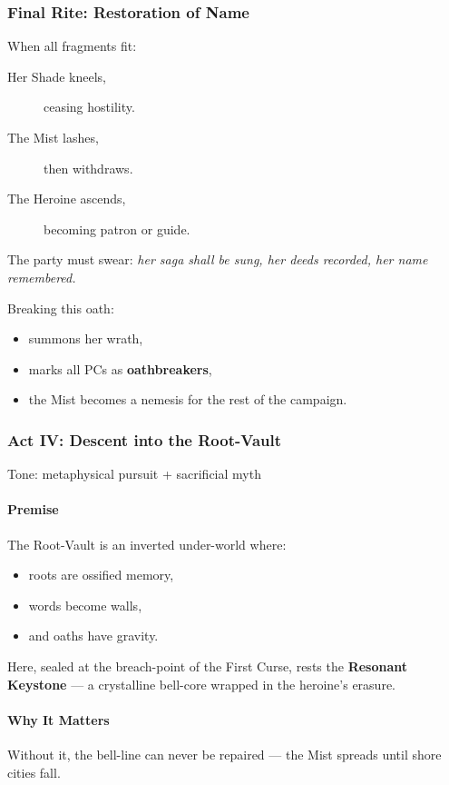 \documentclass[11pt]{article}
\begin{document}
\subsubsection*{Final Rite: Restoration of Name}
When all fragments fit:
\begin{description}
    \item[Her Shade kneels,] ceasing hostility.
    \item[The Mist lashes,] then withdraws.
    \item[The Heroine ascends,] becoming patron or guide.
\end{description}

The party must swear:
\textit{her saga shall be sung,  
her deeds recorded,  
her name remembered.}

Breaking this oath:
\begin{itemize}
    \item summons her wrath,
    \item marks all PCs as \textbf{oathbreakers},
    \item the Mist becomes a nemesis for the rest of the campaign.
\end{itemize}

\subsubsection*{Act IV: Descent into the Root-Vault}

Tone: metaphysical pursuit + sacrificial myth

\paragraph{Premise}
The Root-Vault is an inverted under-world where:
\begin{itemize}
  \item roots are ossified memory,
  \item words become walls,
  \item and oaths have gravity.
\end{itemize}

Here, sealed at the breach-point of the First Curse,
rests the \textbf{Resonant Keystone} ---  
a crystalline bell-core wrapped in the heroine's erasure.

\paragraph{Why It Matters}
Without it, the bell-line can never be repaired ---
the Mist spreads until shore cities fall.
\end{document}
